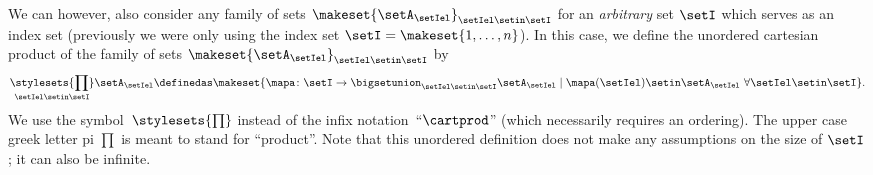 We can however, also consider any family of sets $\makeset{ \setA_\setIel }_{\setIel \setin\setI}$ for an \emph{arbitrary} set $\setI$ which serves as an index set (previously we were only using the index set $\setI = \makeset{1, \dots, n}$).
In this case, we define the unordered cartesian product of the family of sets $\makeset{ \setA_\setIel }_{\setIel \setin\setI}$ by
\begin{equation}
    \underset{\setIel \setin\setI}{\stylesets{\prod}} \setA_{\setIel} \definedas \makeset{ \mapa \colon \setI \to \bigsetunion_{\setIel \setin\setI } \setA_{\setIel} \mid \mapa(\setIel) \setin\setA_{\setIel} \ \forall \setIel \setin\setI}.
\end{equation}
We use the symbol~$\stylesets{\prod}$ instead of the infix notation~``$\cartprod$'' (which necessarily requires an ordering).
The upper case greek letter pi $\prod$ is meant to stand for ``product''.
Note that this unordered definition does not make any assumptions on the size of $\setI$; it can also be infinite.




